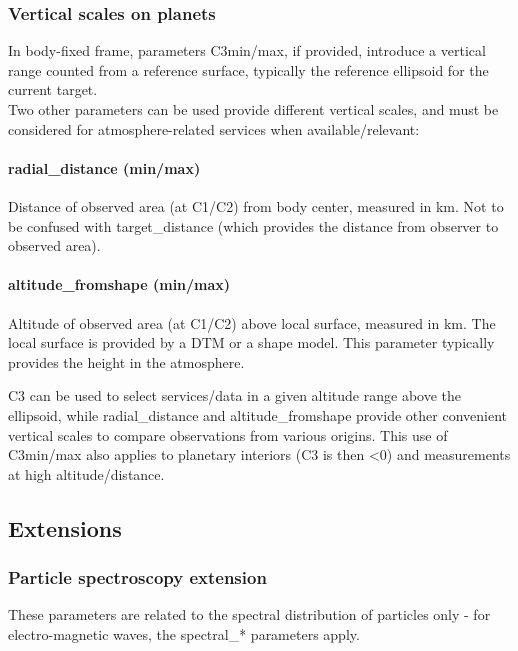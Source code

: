 \documentclass[11pt,a4paper]{ivoa}
\begin{document}
\subsubsection{Vertical scales on planets}

In body-fixed frame, parameters C3min/max, if provided, introduce a vertical range counted from a reference surface, typically the reference ellipsoid for the current target. \\

Two other parameters can be used provide different vertical scales, and must be considered for atmosphere-related services when available/relevant: \\

\paragraph{radial\_distance (min/max)}

Distance of observed area (at C1/C2) from body center, measured in km. Not to be confused with target\_distance (which provides the distance from observer to observed area). 

\paragraph{altitude\_fromshape (min/max)}

Altitude of observed area (at C1/C2) above local surface, measured in km. The local surface is provided by a DTM or a shape model. This parameter typically provides the height in the atmosphere.

C3 can be used to select services/data in a given altitude range above the ellipsoid, while radial\_distance and altitude\_fromshape provide other convenient vertical scales to compare observations from various origins. This use of C3min/max also applies to planetary interiors (C3 is then <0) and measurements at high altitude/distance. 

\subsection{Extensions}

\subsubsection{Particle spectroscopy extension}

These parameters are related to the spectral distribution of particles only - for electro-magnetic waves, the spectral\_* parameters apply.
\end{document}
